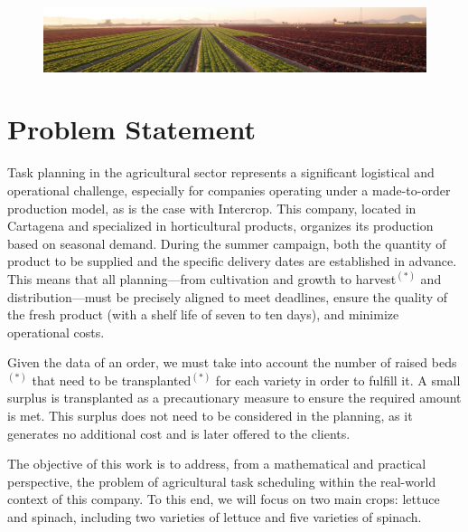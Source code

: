 \vspace{10mm}
\begin{figure}[ht!]
    \centering
    \includegraphics[width=1\textwidth]{img/campitos_lindos.jpeg}
    \label{fig:campitos_lindos}
\end{figure}

\chapter*{Problem Statement}

Task planning in the agricultural sector represents a significant logistical and operational challenge,  
especially for companies operating under a made-to-order production model, as is the case with Intercrop.  
This company, located in Cartagena and specialized in horticultural products, organizes its production based on seasonal demand.  
During the summer campaign, both the quantity of product to be supplied and the specific delivery dates are established in advance.  
This means that all planning—from cultivation and growth to \gls{harvest}$^{(*)}$ and distribution—must be precisely aligned to meet deadlines,  
ensure the quality of the fresh product (with a shelf life of seven to ten days), and minimize operational costs.

Given the data of an order, we must take into account the number of \gls{raised bed}s$^{(*)}$ that need to be \gls{transplanted}$^{(*)}$ for each variety in order to fulfill it.  
A small surplus is transplanted as a precautionary measure to ensure the required amount is met.  
This surplus does not need to be considered in the planning, as it generates no additional cost and is later offered to the clients.
 

The objective of this work is to address, from a mathematical and practical perspective, the problem of agricultural task scheduling within the real-world context of this company.  
To this end, we will focus on two main crops: lettuce and spinach, including two varieties of lettuce and five varieties of spinach.

